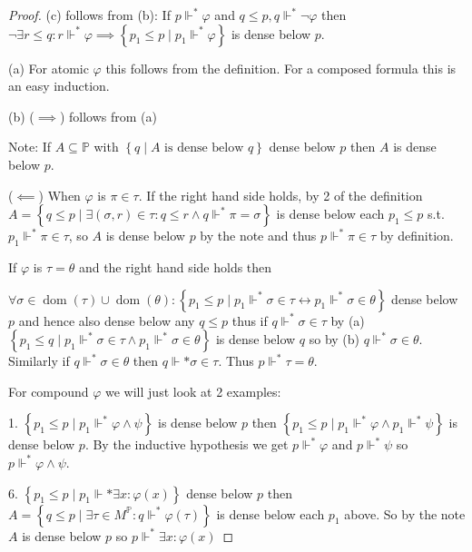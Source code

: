 \documentclass{scrartcl}
\newcommand{\set}[1]{\left\{#1\right\}}
\DeclareMathOperator{\dom}{dom}
\theoremstyle{definition}
\theoremstyle{plain}
\theoremstyle{remark}
\begin{document}
	\begin{proof}
		(c) follows from (b): If $p \Vdash^* \varphi$ and $q \leq p, q \Vdash^* \lnot \varphi$ then
		$\lnot \exists r \leq q: r \Vdash^* \varphi \implies
		\set{p_1 \leq p \mid p_1 \Vdash^* \varphi}$ is dense below $p$.

		(a) For atomic $\varphi$ this follows from the definition.
		For a composed formula this is an easy induction.

		(b) ($\implies$) follows from (a)
		
		Note: If $A \subseteq \mathbb{P}$ with $\set{q \mid A \text{ is dense below } q}$ dense below $p$
		then $A$ is dense below $p$.
		
		($\impliedby$) When $\varphi$ is $\pi \in \tau$. If
		the right hand side holds, by 2 of the definition 
		$A = \set{q \leq p \mid \exists (\sigma, r) \in \tau: q \leq r \land q \Vdash^* \pi = \sigma}$
		is dense below each $p_1 \leq p$ s.t. $p_1 \Vdash^* \pi \in \tau$,
		so $A$ is dense below $p$ by the note and thus $p \Vdash^* \pi \in \tau$ by definition.
	
		If $\varphi$ is $\tau = \theta$ and the right hand side holds
		then 

		$\forall \sigma \in \dom(\tau) \cup \dom(\theta): \set{p_1 \leq p \mid p_1 \Vdash^* \sigma \in \tau \longleftrightarrow
		p_1 \Vdash^* \sigma \in \theta}$ dense below $p$ and hence
		also dense below any $q \leq p$ thus if $q \Vdash^* \sigma \in \tau$
		by (a) $\set{p_1 \leq q \mid p_1 \Vdash^* \sigma \in \tau \land p_1 \Vdash^* \sigma \in \theta}$
		is dense below $q$ so by (b) $q \Vdash^* \sigma \in \theta$.
		Similarly if $q \Vdash^* \sigma \in \theta$ then
		$q \Vdash* \sigma \in \tau$. Thus $p \Vdash^* \tau = \theta$.
		
		For compound $\varphi$ we will just look at 2 examples:

		1. $\set{p_1 \leq p \mid p_1 \Vdash^* \varphi \land \psi}$ is dense below $p$ then
		$\set{p_1 \leq p \mid p_1 \Vdash^* \varphi \land p_1 \Vdash^* \psi}$ is
		dense below $p$. By the inductive hypothesis we get 
		$p \Vdash^* \varphi$ and $p \Vdash^* \psi$ so $p\Vdash^* \varphi \land \psi$.

		6. $\set{p_1 \leq p \mid p_1 \Vdash* \exists x: \varphi(x)}$ dense below $p$ then
		$A = \set{q \leq p \mid \exists \tau \in M^\mathbb{P}: q \Vdash^* \varphi(\tau)}$
		is dense below each $p_1$ above. So by the 
		note $A$ is dense below $p$ so $p \Vdash^* \exists x: \varphi(x)$
	\end{proof}
\end{document}

